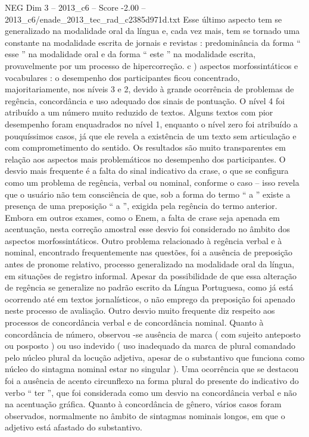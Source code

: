\begin{textsample}{NEG Dim 3 – 2013\_c6 – Score -2.00 – 2013\_c6/enade\_2013\_tec\_rad\_c2385d971d.txt}
Esse último aspecto tem se generalizado na modalidade oral da língua e, cada vez mais, tem se tornado uma constante na modalidade escrita de jornais e revistas : predominância da forma “ esse ” na modalidade oral e da forma “ este ” na modalidade escrita, provavelmente por um processo de hipercorreção. c ) aspectos morfossintáticos e vocabulares : o desempenho dos participantes ficou concentrado, majoritariamente, nos níveis 3 e 2, devido à grande ocorrência de problemas de regência, concordância e uso adequado dos sinais de pontuação.
O nível 4 foi atribuído a um número muito reduzido de textos.
Alguns textos com pior desempenho foram enquadrados no nível 1, enquanto o nível zero foi atribuído a pouquíssimos casos, já que ele revela a existência de um texto sem articulação e com comprometimento do sentido.
Os resultados são muito transparentes em relação aos aspectos mais problemáticos no desempenho dos participantes.
O desvio mais frequente é a falta do sinal indicativo da crase, o que se configura como um problema de regência, verbal ou nominal, conforme o caso – isso revela que o usuário não tem consciência de que, sob a forma do termo “ a ” existe a presença de uma preposição “ a ”, exigida pela regência do termo anterior.
Embora em outros exames, como o Enem, a falta de crase seja apenada em acentuação, nesta correção amostral esse desvio foi considerado no âmbito dos aspectos morfossintáticos.
Outro problema relacionado à regência verbal e à nominal, encontrado frequentemente nas questões, foi a ausência de preposição antes de pronome relativo, processo generalizado na modalidade oral da língua, em situações de registro informal.
Apesar da possibilidade de que essa alteração de regência se generalize no padrão escrito da Língua Portuguesa, como já está ocorrendo até em textos jornalísticos, o não emprego da preposição foi apenado neste processo de avaliação.
Outro desvio muito frequente diz respeito aos processos de concordância verbal e de concordância nominal.
Quanto à concordância de número, observou -se ausência de marca ( com sujeito anteposto ou posposto ) ou uso indevido ( uso inadequado da marca de plural comandado pelo núcleo plural da locução adjetiva, apesar de o substantivo que funciona como núcleo do sintagma nominal estar no singular ).
Uma ocorrência que se destacou foi a ausência de acento circunflexo na forma plural do presente do indicativo do verbo “ ter ”, que foi considerada como um desvio na concordância verbal e não na acentuação gráfica.
Quanto à concordância de gênero, vários casos foram observados, normalmente no âmbito de sintagmas nominais longos, em que o adjetivo está afastado do substantivo.

\end{textsample}
